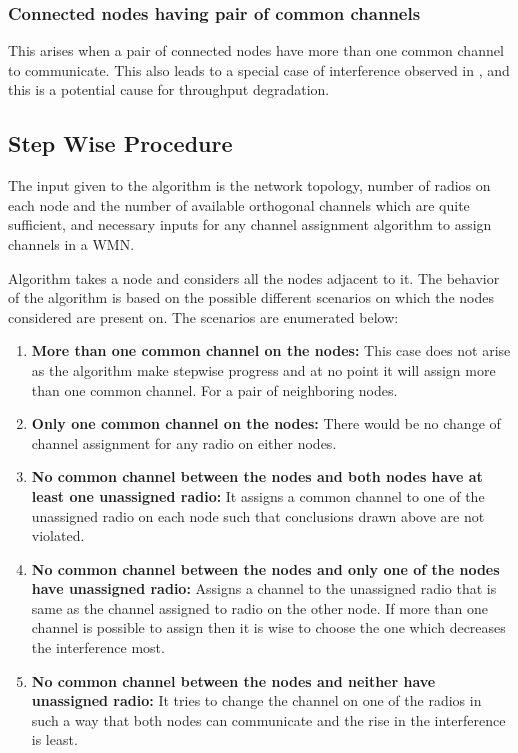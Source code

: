 \documentclass[conference]{IEEEtran}
\begin{document}
\subsubsection{Connected nodes having pair of common channels}
                                  

This arises when a pair of connected nodes have more than one common channel to communicate. 
This also leads to a special case of interference observed in \cite{kala2016interference}, 
and this is a potential cause for throughput degradation.


\subsection{Step Wise Procedure}

The input given to the algorithm is the network topology, 
number of radios on  each node and the number of available orthogonal channels which are quite sufficient, 
 and necessary inputs for any channel assignment algorithm to assign channels in a WMN.
 
Algorithm takes a node and considers all the nodes adjacent to it. 
The behavior of the algorithm is based on the possible different scenarios on which the nodes considered are present on. 
The scenarios are enumerated below:

\begin{enumerate}
 \item \textbf{More than one common channel on the nodes:}
        This case does not arise as the algorithm make stepwise progress and at no point it will assign more than one common channel.
        For a pair of neighboring nodes.
  \item \textbf{Only one common channel on the nodes:}        
        There would be no change of channel assignment for any radio on either nodes.
   \item  \textbf{No common channel between the nodes and both nodes have at least one unassigned radio:}
        It assigns a common channel to one of the unassigned radio on each node such that conclusions drawn above are not violated.

   \item \textbf{No common channel between the nodes and only one of the nodes have unassigned radio:}
        Assigns a channel to the unassigned radio that is same as the channel assigned to radio on the other node. 
        If more than one channel is possible to assign then it is wise to choose the one which decreases the interference most.

   \item \textbf{No common channel between the nodes and neither have unassigned radio:}
         It tries to change the channel on one of the radios in such a way that both nodes can communicate and the rise in the interference is least.


   
\end{enumerate}
\end{document}

